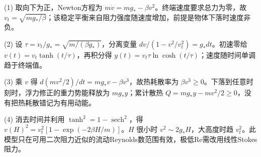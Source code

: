 (1) 取向下为正，Newton方程为 \(m\dot v=mg_*-\beta v^2\)。终端速度要求总力为零，故 \(v_t=\sqrt{mg_*/\beta}\)；该稳定平衡来自阻力强度随速度增加，前提是物体下落时速度非负。

(2) 设 \(\tau=v_t/g_*=\sqrt{m/(\beta g_*)}\)，分离变量 \(dv/(1-v^2/v_t^2)=g_*dt\)。初速零给 \(v(t)=v_t\tanh(t/\tau)\)，再积分得 \(y(t)=v_t\tau\ln\cosh(t/\tau)\)；速度随时间单调趋于终端值。

(3) 乘 \(v\) 得 \(d(mv^2/2)/dt=mg_*v-\beta v^3\)，故热耗散率为 \(\beta v^3\ge0\)。下落到任意时刻时，浮力修正的重力势能释放为 \(mg_*y\)；累计散热 \(Q=mg_*y-mv^2/2\ge0\)，没有把热耗散错记为有用动能。

(4) 消去时间并利用 \(\tanh^2=1-\operatorname{sech}^2\)，得 \(v(H)^2=v_t^2[1-\exp(-2\beta H/m)]\)。\(H\) 很小时 \(v^2\sim2g_*H\)，大高度时趋 \(v_t^2\)。此模型只在可用二次阻力近似的流动Reynolds数范围有效，极低Re需改用线性Stokes阻力。
